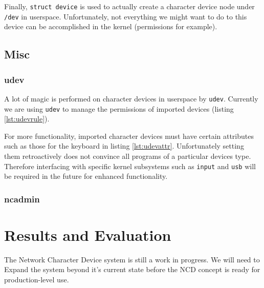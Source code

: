 \documentclass[11pt,twocolumn]{article}
\begin{document}
Finally, \texttt{struct device} is used to actually create a character
device node under \texttt{/dev} in userspace. Unfortunately, not
everything we might want to do to this device can be accomplished in the
kernel (permissions for example).

\subsection{Misc}

\subsubsection{udev}
\label{subsec:udev}



A lot of magic is performed on character devices in userspace by
\texttt{udev}. Currently we are using \texttt{udev} to manage the
permissions of imported devices (listing \ref{lst:udevrule}).



For more functionality, imported character devices must have certain
attributes such as those for the keyboard in listing \ref{lst:udevattr}.
Unfortunately setting them retroactively does not convince all programs
of a particular devices type. Therefore interfacing with specific kernel
subsystems such as \texttt{input} and \texttt{usb} will be required in
the future for enhanced functionality.

\subsubsection{ncadmin}


\section{Results and Evaluation}
\label{sec:results}

The Network Character Device system is still a work in
progress. We will need to Expand the system beyond it's current state
before the NCD concept is ready for production-level use.
\end{document}
